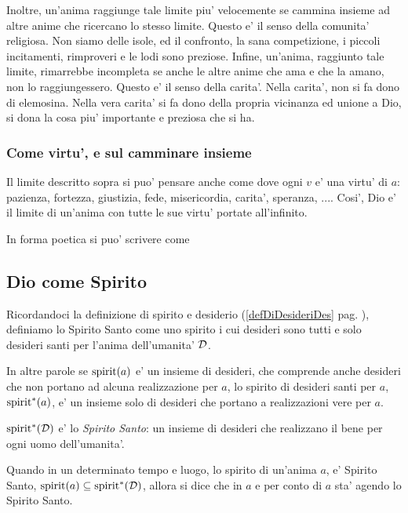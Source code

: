 Inoltre, un'anima raggiunge tale limite piu' velocemente se cammina insieme ad altre anime che ricercano lo stesso limite. Questo e' il senso della comunita' religiosa. Non siamo delle isole, ed il confronto, la sana competizione, i piccoli incitamenti, rimproveri e le lodi sono preziose. Infine, un'anima, raggiunto tale limite, rimarrebbe incompleta se anche le altre anime che ama e che la amano, non lo raggiungessero. Questo e' il senso della carita'.
Nella carita', non si fa dono di elemosina. Nella vera carita' si fa dono della propria vicinanza ed unione a Dio, si dona la cosa piu' importante e preziosa che si ha. 

\subsubsection{Come virtu', e sul camminare insieme}
Il limite descritto sopra
si puo' pensare anche come 
dove ogni $v$ e' una virtu' di $a$: pazienza, fortezza, giustizia, fede, misericordia, carita', speranza, .... Cosi', Dio e' il limite di un'anima con tutte le sue virtu' portate all'infinito.

In forma poetica si puo' scrivere come


\subsection{Dio come Spirito}
\label{DioComeSpirito}

Ricordandoci la definizione di spirito e desiderio (\ref{defDiDesideriDes} pag. \pageref{defDiDesideriDes}), definiamo lo Spirito Santo come uno spirito i cui desideri sono tutti e solo desideri santi per l'anima dell'umanita' $\mathcal{D}$.

In altre parole se $\textrm{spirit}(a)$ e' un insieme di desideri, che comprende anche desideri che non portano ad alcuna realizzazione per $a$, lo spirito di desideri santi per $a$, $\textrm{spirit}^*(a)$, e' un insieme solo di desideri che portano a realizzazioni vere per $a$.

$\textrm{spirit}^*(\mathcal{D})$ e' lo \emph{Spirito Santo}: un insieme di desideri che realizzano il bene per ogni uomo dell'umanita'.

Quando in un determinato tempo e luogo, lo spirito di un'anima $a$, e' Spirito Santo, $\textrm{spirit}(a)\subseteq \textrm{spirit}^*(\mathcal{D})$, allora si dice che in $a$ e per conto di $a$ sta' agendo lo Spirito Santo.

